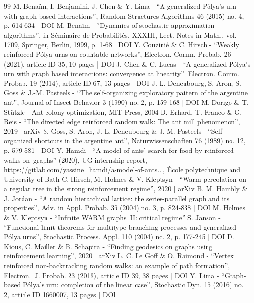 \documentclass[10pt]{amsart}
\numberwithin{equation}{section}
\theoremstyle{definition}
\begin{document}
\begin{thebibliography}{99}
M. Benaïm, I. Benjamini, J. Chen \& Y. Lima - “A generalized Pólya’s urn with graph based interactions”, Random Structures Algorithms 46 (2015) no. 4, p. 614-634 | DOI
M. Benaïm - “Dynamics of stochastic approximation algorithms”, in Séminaire de Probabilités, XXXIII, Lect. Notes in Math., vol. 1709, Springer, Berlin, 1999, p. 1-68 | DOI
Y. Couzinié \& C. Hirsch - “Weakly reinforced Pólya urns on countable networks”, Electron. Comm. Probab. 26 (2021), article ID 35, 10 pages | DOI
J. Chen \& C. Lucas - “A generalized Pólya’s urn with graph based interactions: convergence at linearity”, Electron. Comm. Probab. 19 (2014), article ID 67, 13 pages | DOI
J.-L. Deneubourg, S. Aron, S. Goss \& J.-M. Pasteels - “The self-organizing exploratory pattern of the argentine ant”, Journal of Insect Behavior 3 (1990) no. 2, p. 159-168 | DOI
M. Dorigo \& T. Stützle - Ant colony optimization, MIT Press, 2004
D. Erhard, T. Franco \& G. Reis - “The directed edge reinforced random walk: The ant mill phenomenon”, 2019 | arXiv
S. Goss, S. Aron, J.-L. Deneubourg \& J.-M. Pasteels - “Self-organized shortcuts in the argentine ant”, Naturwissenschaften 76 (1989) no. 12, p. 579-581 | DOI
Y. Hamdi - “A model of ants’ search for food by reinforced walks on graphs” (2020), UG internship report, https://gitlab.com/yassine\_hamdi/a-model-of-ants..., École polytechnique and University of Bath
C. Hirsch, M. Holmes \& V. Kleptsyn - “Warm percolation on a regular tree in the strong reinforcement regime”, 2020 | arXiv
B. M. Hambly \& J. Jordan - “A random hierarchical lattice: the series-parallel graph and its properties”, Adv. in Appl. Probab. 36 (2004) no. 3, p. 824-838 | DOI
M. Holmes \& V. Kleptsyn - “Infinite WARM graphs II: critical regime”
S. Janson - “Functional limit theorems for multitype branching processes and generalized Pólya urns”, Stochastic Process. Appl. 110 (2004) no. 2, p. 177-245 | DOI
D. Kious, C. Mailler \& B. Schapira - “Finding geodesics on graphs using reinforcement learning”, 2020 | arXiv
L. C. Le Goff \& O. Raimond - “Vertex reinforced non-backtracking random walks: an example of path formation”, Electron. J. Probab. 23 (2018), article ID 39, 38 pages | DOI
Y. Lima - “Graph-based Pólya’s urn: completion of the linear case”, Stochastic Dyn. 16 (2016) no. 2, article ID 1660007, 13 pages | DOI

\end{thebibliography}
\end{document}
